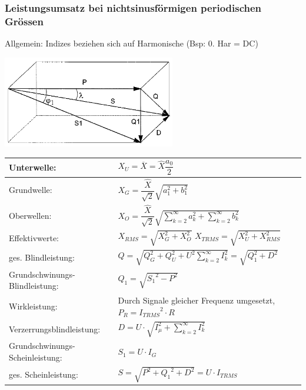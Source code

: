 		\subsubsection{Leistungsumsatz bei nichtsinusf\"ormigen periodischen Gr\"ossen}
		\begin{minipage}[c]{7.5cm}
			\parbox{4cm}{Allgemein: Indizes beziehen sich auf Harmonische (Bsp: 0. Har = DC)\\}
			\includegraphics[height=4cm]{bilder/ZeigerdiagrammNichtSinus.png}     
    	\end{minipage}%
		\begin{minipage}[c]{10.5cm}   
    		\noindent
    		\renewcommand{\arraystretch}{2.0}
    		\begin{tabular}{|p{3.6cm}p{7.3cm}|}
	    		\hline
	        		Unterwelle: 
	        			& $X_{U} = \overline{X} = \hat{X}\dfrac{a_0}{2}  \qquad $  \\
	        	\hline
		     		Grundwelle: 
		     			& $X_{G} = \dfrac{\hat{X}}{\sqrt{2}} \sqrt{a_1^2 + b_1^2} \qquad  $   \\
		     	\hline
		     		Oberwellen: 
		     			& $X_{O} = \dfrac{\hat{X}}{\sqrt{2}}
		     			\sqrt{\sum\limits_{k=2}^{\infty}a_k^2 +\sum\limits_{k=2}^{\infty}b_k^2}
		     			\qquad $  \\ 
		     	\hline
		     		Effektivwerte:&
		     		 $X_{RMS} = \sqrt{X_G^2 + X_O^2}$ \newline  $X_{TRMS} =
		     			\sqrt{X_U^2 + X_{RMS}^2}$ \\
	     		\hline
					ges. Blindleistung: &
						$Q = 	\sqrt{Q_G^2 + Q_U^2 + U^2  \sum\limits_{k=2}^{\infty}{I_k^2}} = \sqrt{Q_1^2 + D^2}$ \\
				\hline 
					Grundschwinungs-Blindleistung: &
						$Q_1 = \sqrt{{S_1}^2 - P^2}$ \\
				\hline
					Wirkleistung: &
						Durch Signale gleicher Frequenz umgesetzt, $P_R = {I_{TRMS}}^2 \cdot R$ \\
				\hline
					Verzerrungsblindleistung: &
						$D = U \cdot \sqrt{I_{\mu}^2 + \sum\limits_{k=2}^{\infty}I_k^2}$ \\
				\hline
					Grundschwinungs-Scheinleistung: &
						$S_1 = U \cdot I_G$ \\
				\hline
					ges. Scheinleistung: &
						$S = \sqrt{P^2 + {Q_1}^2 + D^2} = U \cdot I_{TRMS}$ \\
				\hline
		 	\end{tabular} \\
		 \renewcommand{\arraystretch}{1}
     	\end{minipage}    		\\ \\
